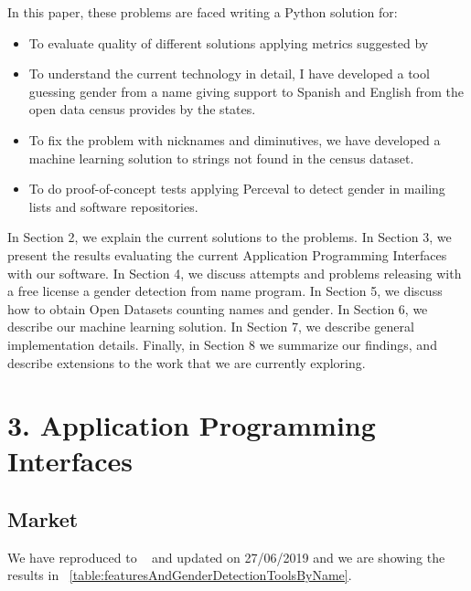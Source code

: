 \documentclass[a4paper]{article}
\begin{document}
In this paper, these problems are faced writing a Python solution for:
\begin{itemize}
\item To evaluate quality of different solutions applying metrics
  suggested by ~\cite{10.7717/peerj-cs.156}
\item To understand the current technology in detail, I have developed
  a tool guessing gender from a name giving support to Spanish and
  English from the open data census provides by the states.
\item To fix the problem with nicknames and diminutives, we have
  developed a machine learning solution to strings not found in the
  census dataset.
\item To do proof-of-concept tests applying Perceval to detect
  gender in mailing lists and software repositories.
\end{itemize}

In Section 2, we explain the current solutions to the problems. In
Section 3, we present the results evaluating the current Application
Programming Interfaces with our software. In Section 4, we discuss
attempts and problems releasing with a free license a gender detection
from name program. In Section 5, we discuss how to obtain Open Datasets
counting names and gender. In Section 6, we describe our
machine learning solution. In Section 7, we describe general
implementation details. Finally, in Section 8 we summarize our
findings, and describe extensions to the work that we are currently
exploring.

\section*{3. Application Programming Interfaces}

\subsection*{Market}

We have reproduced to ~\cite{10.7717/peerj-cs.156} and updated on
27/06/2019 and we are showing the results in
~\ref{table:featuresAndGenderDetectionToolsByName}.
\end{document}
